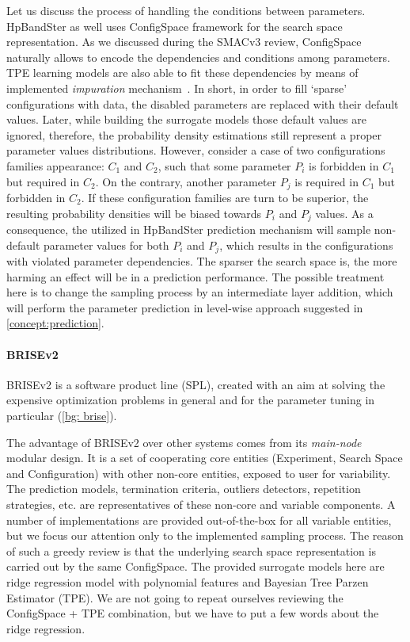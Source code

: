 Let us discuss the process of handling the conditions between parameters. HpBandSter as well uses ConfigSpace framework for the search space representation. As we discussed during the SMACv3 review, ConfigSpace naturally allows to encode the dependencies and conditions among parameters. TPE learning models are also able to fit these dependencies by means of implemented \emph{impuration} mechanism~\cite{levesque2017bayesian}. In short, in order to fill `sparse' configurations with data, the disabled parameters are replaced with their default values. Later, while building the surrogate models those default values are ignored, therefore, the probability density estimations still represent a proper parameter values distributions. However, consider a case of two configurations families appearance: $C_1$ and $C_2$, such that some parameter $P_i$ is forbidden in $C_1$ but required in $C_2$. On the contrary, another parameter $P_j$ is required in $C_1$ but forbidden in $C_2$. If these configuration families are turn to be superior, the resulting probability densities will be biased towards $P_i$ and $P_j$ values. As a consequence, the utilized in HpBandSter prediction mechanism will sample non-default parameter values for both $P_i$ and $P_j$, which results in the configurations with violated parameter dependencies. The sparser the search space is, the more harming an effect will be in a prediction performance. The possible treatment here is to change the sampling process by an intermediate layer addition, which will perform the parameter prediction in level-wise approach suggested in \cref{concept:prediction}.

\paragraph{BRISEv2}
BRISEv2 is a software product line (SPL), created with an aim at solving the expensive optimization problems in general and for the parameter tuning in particular (\cref{bg: brise}).

The advantage of BRISEv2 over other systems comes from its \emph{main-node} modular design. It is a set of cooperating core entities (Experiment, Search Space and Configuration) with other non-core entities, exposed to user for variability. The prediction models, termination criteria, outliers detectors, repetition strategies, etc. are representatives of these non-core and variable components. A number of implementations are provided out-of-the-box for all variable entities, but we focus our attention only to the implemented sampling process. The reason of such a greedy review is that the underlying search space representation is carried out by the same ConfigSpace. The provided surrogate models here are ridge regression model with polynomial features and Bayesian Tree Parzen Estimator (TPE). We are not going to repeat ourselves reviewing the ConfigSpace + TPE combination, but we have to put a few words about the ridge regression.

